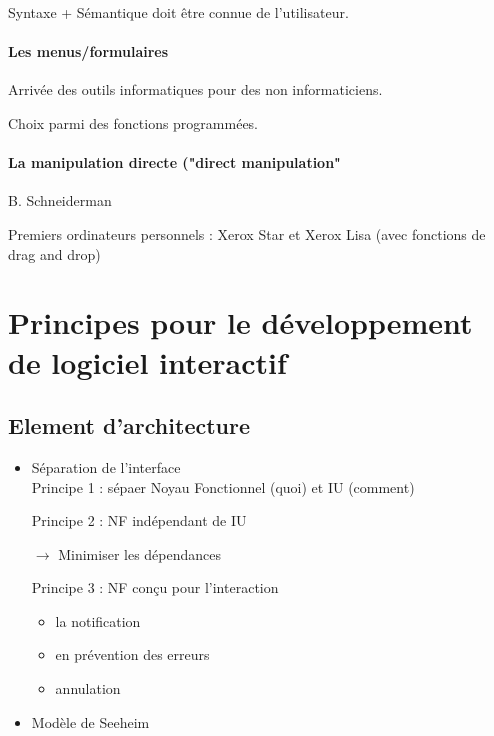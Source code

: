 \documentclass{report}
\begin{document}
Syntaxe + Sémantique doit être connue de l'utilisateur.

\subsubsection{Les menus/formulaires}
Arrivée des outils informatiques pour des non informaticiens.

Choix parmi des fonctions programmées.

\subsubsection{La manipulation directe ("direct manipulation"}
B. Schneiderman

Premiers ordinateurs personnels : Xerox Star et Xerox Lisa (avec fonctions de drag and drop)

\chapter{Principes pour le développement de logiciel interactif}
\section{Element d'architecture}
\begin{itemize}
	\item Séparation de l'interface\\
	
Principe 1 : sépaer Noyau Fonctionnel (quoi) et IU (comment)

Principe 2 : NF indépendant de IU

$\rightarrow$ Minimiser les dépendances

Principe 3 : NF conçu pour l'interaction 

	\begin{itemize}
		\item la notification
		\item en prévention des erreurs
		\item annulation
	\end{itemize}
	
	\item Modèle de Seeheim
\end{itemize}
\end{document}

